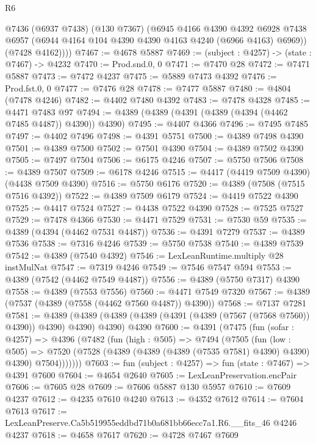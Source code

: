 \begin{lexlean}{R6}
\begin{coremodule}
        @7436
          (@6937 @7438)
          (@130 @7367)
          (@6945
            @4166
            @4390
            @4392
            @6928
            @7438
            @6957
            (@6944 @4164 @104 @4390 @4390 @4163 @4240 (@6966 @4163) @6969))
          (@7428 @4162))))
@7467 := @4678 @5887
@7469 := (subject : @4257) -> (state : @7467) -> @4232
@7470 := Prod.snd.{0, 0}
@7471 := @7470 @28
@7472 := @7471 @5887
@7473 := @7472 @4237
@7475 := @5889 @7473 @4392
@7476 := Prod.fst.{0, 0}
@7477 := @7476 @28
@7478 := @7477 @5887
@7480 := @4804 (@7478 @4246)
@7482 := @4402 @7480 @4392
@7483 := @7478 @4328
@7485 := @4471 @7483 @97
@7494 := @4389 (@4389 (@4391 (@4389 (@4394 (@4462 @7485 @4487)) @4390)) @4390)
@7495 := @4407 @4366
@7496 := @7495 @7485
@7497 := @4402 @7496
@7498 := @4391 @5751
@7500 := @4389 @7498 @4390
@7501 := @4389 @7500
@7502 := @7501 @4390
@7504 := @4389 @7502 @4390
@7505 := @7497 @7504
@7506 := @6175 @4246
@7507 := @5750 @7506
@7508 := @4389 @7507
@7509 := @6178 @4246
@7515 := @4417 (@4419 @7509 @4390) (@4438 @7509 @4390)
@7516 := @5750 @6176
@7520 := @4389 (@7508 (@7515 @7516 @4392))
@7522 := @4389 @7509 @6179
@7524 := @4419 @7522 @4390
@7525 := @4417 @7524
@7527 := @4438 @7522 @4390
@7528 := @7525 @7527
@7529 := @7478 @4366
@7530 := @4471 @7529
@7531 := @7530 @59
@7535 := @4389 (@4394 (@4462 @7531 @4487))
@7536 := @4391 @7279
@7537 := @4389 @7536
@7538 := @7316 @4246
@7539 := @5750 @7538
@7540 := @4389 @7539
@7542 := @4389 (@7540 @4392)
@7546 := LexLeanRuntime.multiply @28 instMulNat
@7547 := @7319 @4246
@7549 := @7546 @7547 @594
@7553 := @4389 (@7542 (@4462 @7549 @4487))
@7556 := @4389 (@5750 @7317) @4390
@7558 := @4389 (@7553 @7556)
@7560 := @4471 @7549 @7320
@7567 := @4389 (@7537 (@4389 (@7558 (@4462 @7560 @4487)) @4390))
@7568 := @7137 @7281
@7581 := @4389
    (@4389 (@4389 (@4389 (@4391 (@4389 (@7567 (@7568 @7560)) @4390)) @4390) @4390) @4390)
    @4390
@7600 := @4391
    (@7475
      (fun (sofar : @4257) =>
      @4396
        (@7482
          (fun (high : @505) =>
          @7494
            (@7505
              (fun (low : @505) =>
              @7520 (@7528 (@4389 (@4389 (@4389 (@7535 @7581) @4390) @4390) @4390) @7504)))))))
@7603 := fun (subject : @4257) => fun (state : @7467) => @4391 @7600
@7604 := @4654 @2640
@7605 := LexLeanPreservation.encPair
@7606 := @7605 @28
@7609 := @7606 @5887 @130 @5957
@7610 := @7609 @4237
@7612 := @4235 @7610 @4240
@7613 := @4352 @7612
@7614 := @7604 @7613
@7617 := LexLeanPreserve.Ca5b519955eddbd71b0a681bb66ecc7a1.R6.__fits_46 @4246 @4237
@7618 := @4658 @7617
@7620 := @4728 @7467 @7609

\end{coremodule}
\end{lexlean}
